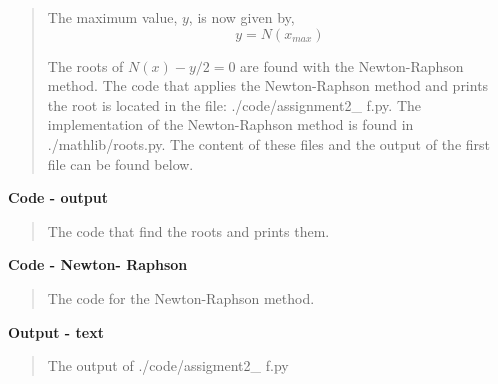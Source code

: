 \begin{quote}
The maximum value, $y$, is now given by,
\begin{equation}
y = N(x_{max})
\end{equation}


The roots of $N(x) - y/2 = 0$ are found with the Newton-Raphson method. The code that applies the Newton-Raphson method and prints the root is located in the file: \textsf{./code/assignment2\_ f.py}. The implementation of the Newton-Raphson method  is found in \textsf{./mathlib/roots.py}. The content of these files and the output of the first file can be found below. %
\end{quote}

\textbf{Code - output}
\begin{quote}
The code that find the roots and prints them.

\end{quote}

\textbf{Code - Newton- Raphson}
\begin{quote}
The code for the Newton-Raphson method.

\end{quote}

\textbf{Output - text}
\begin{quote}
The output of \textsf{./code/assigment2\_ f.py}

\end{quote}



 






